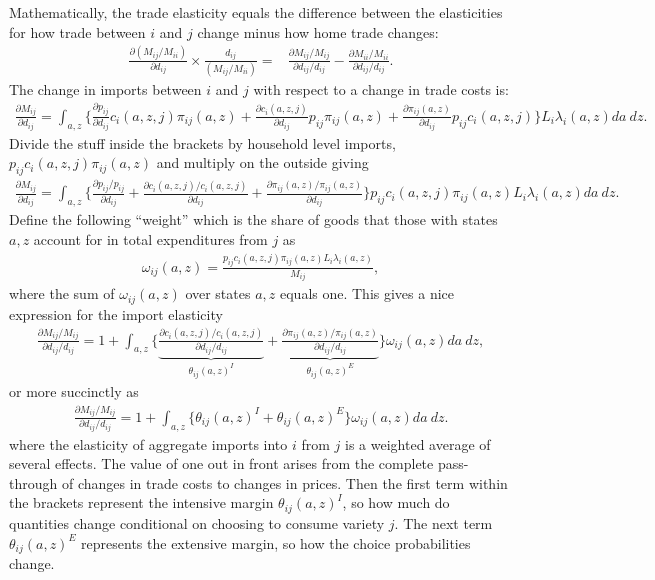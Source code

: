 \documentclass[12pt,pdftex]{article}
\begin{document}
\begin{onehalfspacing}
Mathematically, the trade elasticity equals the difference between the elasticities for how trade between $i$ and $j$ change minus how home trade changes:
\begin{align}
\frac{\partial ( M_{ij} / M_{ii} )}{\partial d_{ij}} \times \frac{d_{ij}}{( M_{ij} / M_{ii} )} =& \frac{\partial M_{ij} / M_{ij}}{\partial d_{ij} / d_{ij}}  - \frac{\partial M_{ii} / M_{ii}}{\partial d_{ij} / d_{ij}}.
\label{apx-eq:def_trade_elasticity}
\end{align}
The change in imports between $i$ and $j$ with respect to a change in trade costs is:
\begin{align}
\frac{\partial  M_{ij}}{\partial d_{ij}} = \int_{a,z} \bigg \{\frac{\partial p_{ij}}{\partial d_{ij}} c_{i}(a,z,j) \pi_{ij}(a,z) +  \frac{\partial c_{i}(a,z,j)}{\partial d_{ij}} p_{ij} \pi_{ij}(a,z) +
 \frac{\partial \pi_{ij}(a,z)}{\partial d_{ij}} p_{ij}c_{i}(a,z,j) \bigg \} L_i \lambda_{i}(a,z) da \ dz.
\end{align}
Divide the stuff inside the brackets by household level imports, $p_{ij}c_{i}(a,z,j)\pi_{ij}(a,z)$ and multiply on the outside giving
\begin{align}
\frac{\partial  M_{ij}}{\partial d_{ij}} = \int_{a,z}  \bigg \{ \frac{\partial p_{ij}/p_{ij}}{\partial d_{ij}}  + \frac{\partial c_{i}(a,z,j)/ c_{i}(a,z,j)}{\partial d_{ij}} +
 \frac{\partial \pi_{ij}(a,z) / \pi_{ij}(a,z)}{\partial d_{ij}}  \bigg \} p_{ij}c_{i}(a,z,j)\pi_{ij}(a,z) L_i \lambda_{i}(a,z)da \ dz.
\end{align}
Define the following ``weight'' which is the share of goods that those with states $a,z$ account for in total expenditures from $j$ as
\begin{align}
\omega_{ij}(a,z) = \frac{p_{ij}c_{i}(a,z,j)\pi_{ij}(a,z) L_i \lambda_{i}(a,z)}{M_{ij}},
\end{align}
where the sum of $\omega_{ij}(a,z)$ over states $a,z$ equals one. This gives a nice expression for the import elasticity
\begin{align}
\frac{\partial  M_{ij} / M_{ij}}{\partial d_{ij} / d_{ij}} = 1 + \int_{a,z} \bigg \{ \underbrace{ \frac{\partial c_{i}(a,z,j)/ c_{i}(a,z,j)}{\partial d_{ij} / d_{ij}} }_{\theta_{ij}(a,z)^{I}}+
\underbrace{\frac{\partial \pi_{ij}(a,z) / \pi_{ij}(a,z)}{\partial d_{ij} / d_{ij}} }_{\theta_{ij}(a,z)^{E}} \bigg \} \omega_{ij}(a,z)da \ dz,
\end{align}
or more succinctly as
\begin{align}
\frac{\partial  M_{ij} / M_{ij}}{\partial d_{ij} / d_{ij}} = 1 + \int_{a,z} \bigg \{ \theta_{ij}(a,z)^{I} + \theta_{ij}(a,z)^{E} \bigg \}\omega_{ij}(a,z)da \ dz.
\end{align}
where the elasticity of aggregate imports into $i$ from $j$ is a weighted average of several effects. The value of one out in front arises from the complete pass-through of changes in trade costs to changes in prices. Then the first term within the brackets represent the intensive margin $\theta_{ij}(a,z)^{I}$, so how much do quantities change conditional on choosing to consume variety $j$. The next term $\theta_{ij}(a,z)^{E}$ represents the extensive margin, so how the choice probabilities change.


\end{onehalfspacing}
\end{document}
